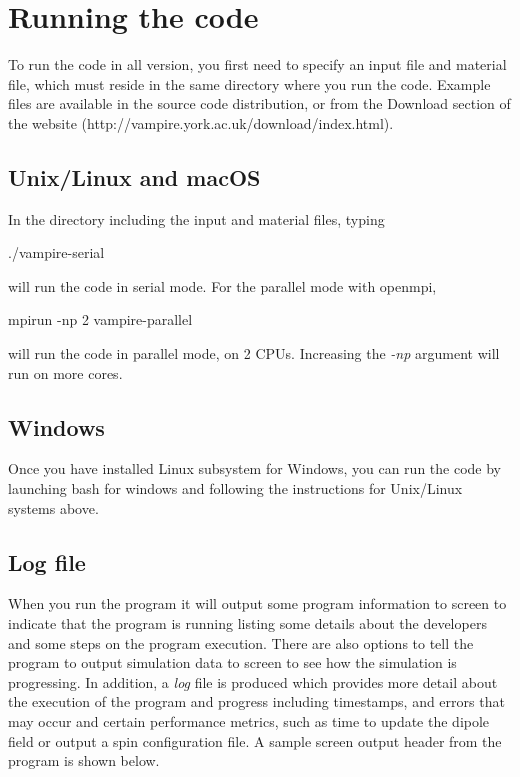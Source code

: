 %
%
%
%
\chapter{Running the code}
To run the code in all version, you first need to specify an input file and material file, which must reside in the same directory where you run the code. Example files are available in the source code distribution, or from the Download section of the website (http://vampire.york.ac.uk/download/index.html).

\section*{Unix/Linux and macOS}
In the directory including the input and material files, typing

\noindent
\begin{minipage}[c]{\textwidth}
\centering
./vampire-serial
\end{minipage}

\noindent will run the code in serial mode. For the parallel mode with openmpi,

\noindent
\begin{minipage}[c]{\textwidth}
\centering
mpirun -np 2 vampire-parallel
\end{minipage}

\noindent will run the code in parallel mode, on 2 CPUs. Increasing the \textit{-np} argument will run on more cores.

\section*{Windows}
Once you have installed Linux subsystem for Windows, you can run the code by launching bash for windows and following the instructions for Unix/Linux systems above.

\section*{Log file}
When you run the program it will output some program information to screen to indicate that the program is running listing some details about the developers and some steps on the program execution. There are also options to tell the program to output simulation data to screen to see how the simulation is progressing. In addition, a \textit{log} file is produced which provides more detail about the execution of the program and progress including timestamps, and errors that may occur and certain performance metrics, such as time to update the dipole field or output a spin configuration file. A sample screen output header from the program is shown below.


